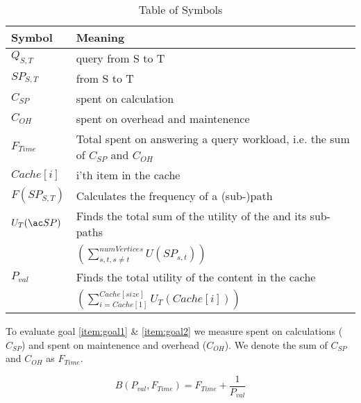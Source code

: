 \begin{table}
\begin{tabular*}{\columnwidth}{|l||p{}|}
\hline
\bf Symbol		& \bf Meaning \\\hline
$Q_{S,T}$		& \spath query from S to T \\\hline
$SP_{S,T}$		& \spath from S to T \\\hline
$C_{SP}$		& \cet spent on \spath calculation \\\hline
$C_{OH}$		& \cet spent on overhead and maintenence \\\hline
$F_{Time}$		& Total \cet spent on answering a query workload, i.e. the sum of  $C_{SP}$ and $C_{OH}$\\\hline
$Cache[i]$		& i'th item in the cache \\\hline
$F(SP_{S,T})$		& Calculates the frequency of a (sub-)path \\\hline
$U_T(\spath)$		& Finds the total sum of the utility of the \spath and its sub-paths \\
			& $\left(\sum\limits_{s,t, s \neq t}^{numVertices} U(SP_{s,t})\right)$\\\hline
$P_{val}$		& Finds the total utility of the content in the cache \\ 
			& $\left(\sum\limits_{i=Cache[1]}^{Cache[size]} U_T\left(Cache[i]\right)\right)$ \\\hline

\end{tabular*}
\caption{Table of Symbols}
\label{tab:impSym}
\end{table}



To evaluate goal \ref{item:goal1} \& \ref{item:goal2} we measure \cet spent on \spath calculations ($C_{SP}$) and \cet spent on maintenence and overhead ($C_{OH}$). We denote the sum of $C_{SP}$ and $C_{OH}$ as $F_{Time}$.

\begin{equation}
B(P_{val},F_{Time}) = F_{Time} + \frac{1}{P_{val}}
\end{equation}